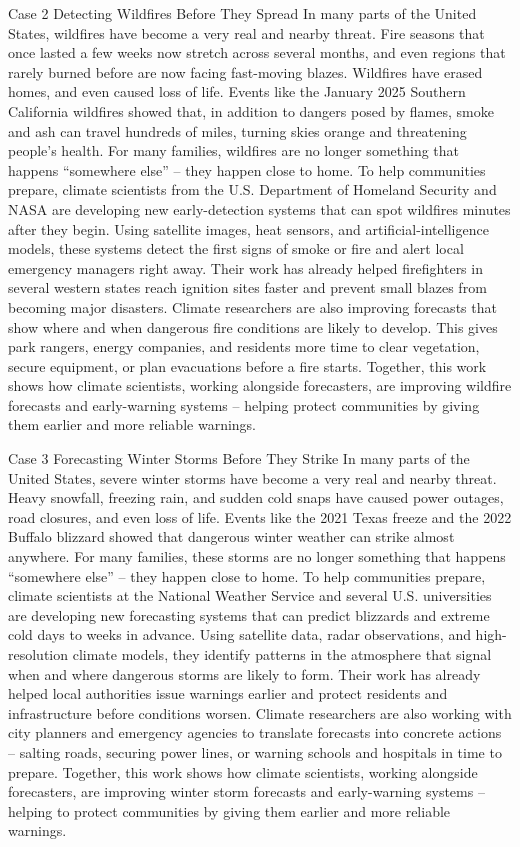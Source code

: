 \documentclass[
  letterpaper,
  DIV=11,
  numbers=noendperiod]{scrartcl}
\begin{document}
Case 2 Detecting Wildfires Before They Spread In many parts of the
United States, wildfires have become a very real and nearby threat. Fire
seasons that once lasted a few weeks now stretch across several months,
and even regions that rarely burned before are now facing fast-moving
blazes. Wildfires have erased homes, and even caused loss of life.
Events like the January 2025 Southern California wildfires showed that,
in addition to dangers posed by flames, smoke and ash can travel
hundreds of miles, turning skies orange and threatening people's health.
For many families, wildfires are no longer something that happens
``somewhere else'' -- they happen close to home. To help communities
prepare, climate scientists from the U.S. Department of Homeland
Security and NASA are developing new early-detection systems that can
spot wildfires minutes after they begin. Using satellite images, heat
sensors, and artificial-intelligence models, these systems detect the
first signs of smoke or fire and alert local emergency managers right
away. Their work has already helped firefighters in several western
states reach ignition sites faster and prevent small blazes from
becoming major disasters. Climate researchers are also improving
forecasts that show where and when dangerous fire conditions are likely
to develop. This gives park rangers, energy companies, and residents
more time to clear vegetation, secure equipment, or plan evacuations
before a fire starts. Together, this work shows how climate scientists,
working alongside forecasters, are improving wildfire forecasts and
early-warning systems -- helping protect communities by giving them
earlier and more reliable warnings.

Case 3 Forecasting Winter Storms Before They Strike In many parts of the
United States, severe winter storms have become a very real and nearby
threat. Heavy snowfall, freezing rain, and sudden cold snaps have caused
power outages, road closures, and even loss of life. Events like the
2021 Texas freeze and the 2022 Buffalo blizzard showed that dangerous
winter weather can strike almost anywhere. For many families, these
storms are no longer something that happens ``somewhere else'' -- they
happen close to home. To help communities prepare, climate scientists at
the National Weather Service and several U.S. universities are
developing new forecasting systems that can predict blizzards and
extreme cold days to weeks in advance. Using satellite data, radar
observations, and high-resolution climate models, they identify patterns
in the atmosphere that signal when and where dangerous storms are likely
to form. Their work has already helped local authorities issue warnings
earlier and protect residents and infrastructure before conditions
worsen. Climate researchers are also working with city planners and
emergency agencies to translate forecasts into concrete actions --
salting roads, securing power lines, or warning schools and hospitals in
time to prepare. Together, this work shows how climate scientists,
working alongside forecasters, are improving winter storm forecasts and
early-warning systems -- helping to protect communities by giving them
earlier and more reliable warnings.
\end{document}
